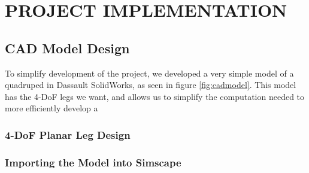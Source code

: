 \section{PROJECT IMPLEMENTATION}
\subsection{CAD Model Design} \label{sec:CAD Model Design}
To simplify development of the project, we developed a very simple model of a quadruped in Dassault SolidWorks, as seen in figure \ref{fig:cadmodel}. This model has the 4-DoF legs we want, and allows us to simplify the computation needed to more efficiently develop a 

\subsubsection*{4-DoF Planar Leg Design} \label{sec:legdesign}

\subsubsection*{Importing the Model into Simscape}

